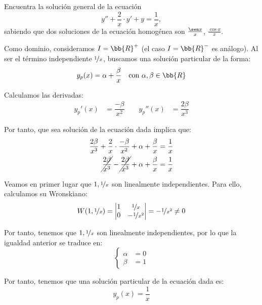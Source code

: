\begin{ejercicio}\label{ej:4.3}
    Encuentra la solución general de la ecuación
    \[
        y'' + \frac{2}{x}\cdot y' + y = \frac{1}{x},
    \]
    sabiendo que dos soluciones de la ecuación homogénea son $\frac{\sen x}{x}$, $\frac{\cos x}{x}$.
    
    Como dominio, consideramos $I=\bb{R}^+$ (el caso $I=\bb{R}^-$ es análogo).
    Al ser el término independiente $\nicefrac{1}{x}$, buscamos una solución particular de la forma:
    \begin{equation*}
        y_p(x)=\alpha + \dfrac{\beta}{x} \quad \text{con } \alpha,\beta\in \bb{R}
    \end{equation*}

    Calculamos las derivadas:
    \begin{align*}
        y_p'(x)&=\dfrac{-\beta}{x^2}\qquad 
        y_p''(x)&=\dfrac{2\beta}{x^3}
    \end{align*}

    Por tanto, que sea solución de la ecuación dada implica que:
    \begin{align*}
        \dfrac{2\beta}{x^3}+\dfrac{2}{x}\cdot \dfrac{-\beta}{x^2}+\alpha+\dfrac{\beta}{x}&=\dfrac{1}{x}\\
        \cancel{\dfrac{2\beta}{x^3}}-\cancel{\dfrac{2\beta}{x^3}}+\alpha+\dfrac{\beta}{x}&=\dfrac{1}{x}
    \end{align*}

    Veamos en primer lugar que $1,\nicefrac{1}{x}$ son linealmente independientes. Para ello, calculamos su Wronskiano:
    \begin{equation*}
        W(1,\nicefrac{1}{x})=\begin{vmatrix}
            1 & \nicefrac{1}{x}\\
            0 & -\nicefrac{1}{x^2}
        \end{vmatrix}=-\nicefrac{1}{x^2}\neq 0
    \end{equation*}

    Por tanto, tenemos que $1,\nicefrac{1}{x}$ son linealmente independientes, por lo que la igualdad anterior se traduce en:
    \begin{equation*}
        \left\{
        \begin{aligned}
            \alpha&= 0\\
            \beta &= 1
        \end{aligned}
        \right.
    \end{equation*}

    Por tanto, tenemos que una solución particular de la ecuación dada es:
    \begin{equation*}
        y_p(x)=\dfrac{1}{x}
    \end{equation*}


\end{ejercicio}
